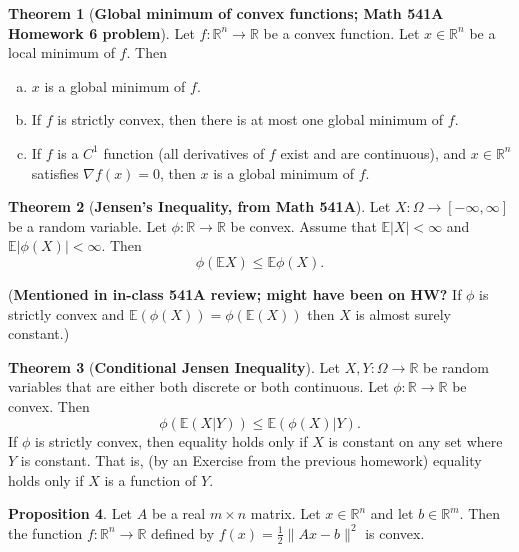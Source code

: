 \documentclass{article}
\newcommand{\E}{\mathbb{E}}
\theoremstyle{definition}
\newtheorem{theorem}{Theorem}
\theoremstyle{definition}
\newtheorem{proposition}[theorem]{Proposition}
\theoremstyle{definition}
\theoremstyle{definition}
\theoremstyle{definition}
\theoremstyle{definition}
\theoremstyle{definition}
\begin{document}
\begin{theorem}[\textbf{Global minimum of convex functions; Math 541A Homework 6 problem}]\label{cvx.541a.exercise3.5}
Let $f: \mathbb{R}^{n}\to\mathbb{R}$ be a convex function.  Let $x\in\mathbb{R}^{n}$ be a local minimum of $f$. Then

\begin{enumerate}[(a)]

\item $x$ is a global minimum of $f$.

\item If $f$ is strictly convex, then there is at most one global minimum of $f$.

\item  If $f$ is a $C^{1}$ function (all derivatives of $f$ exist and are continuous), and $x\in\mathbb{R}^{n}$ satisfies $\nabla f(x)=0$, then $x$ is a global minimum of $f$.

\end{enumerate}
\end{theorem}

\begin{theorem}[\textbf{Jensen's Inequality, from Math 541A}]\label{cvx.jensen.general}Let $X:\Omega\to[-\infty,\infty]$ be a random variable.  Let $\phi:\mathbb{R}\to\mathbb{R}$ be convex.  Assume that $\E|X|<\infty$ and $\E|\phi(X)|<\infty$.  Then
$$\phi(\E X)\leq \E \phi(X).$$

(\textbf{Mentioned in in-class 541A review; might have been on HW?} If \(\phi\) is strictly convex and \(\E(\phi(X)) = \phi(\E(X))\) then \(X\) is almost surely constant.)
\end{theorem}

\begin{theorem}[\textbf{Conditional Jensen Inequality}]\label{cvx.541A.exercise5.89}
Let $X,Y:\Omega\to\mathbb{R}$ be random variables that are either both discrete or both continuous.  Let $\phi : \mathbb{R} \to \mathbb{R}$ be convex.  Then
$$\phi(\E( X|Y))\leq \E( \phi(X)|Y).$$
If $\phi$ is strictly convex, then equality holds only if $X$ is constant on any set where $Y$ is constant.  That is, (by an Exercise from the previous homework) equality holds only if $X$ is a function of $Y$.

\end{theorem}

\begin{proposition}
Let $A$ be a real $m\times n$ matrix. Let $x\in\mathbb{R}^{n}$ and let $b\in\mathbb{R}^{m}$. Then the function $f\colon\mathbb{R}^{n}\to\mathbb{R}$ defined by $f(x)=\frac{1}{2}\lVert Ax-b\rVert ^{2}$ is convex.


\end{proposition}
\end{document}
